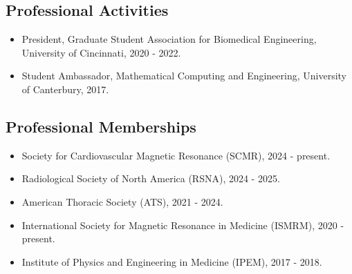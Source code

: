 \documentclass[12pt,]{scrartcl}
\begin{document}





\subsection{Professional Activities}\label{professional-activities}

\begin{itemize}
  \leftskip-0.25in
  \item President, Graduate Student Association for Biomedical Engineering, University of Cincinnati, 2020 - 2022.
  \item Student Ambassador, Mathematical Computing and Engineering, University of Canterbury, 2017.

\end{itemize}

\subsection{Professional Memberships}\label{professional-memberships}

\begin{itemize}
  \leftskip-0.25in
  \item Society for Cardiovascular Magnetic Resonance (SCMR), 2024 - present.
  \item Radiological Society of North America (RSNA), 2024 - 2025.
  \item American Thoracic Society (ATS), 2021 - 2024.
  \item International Society for Magnetic Resonance in Medicine (ISMRM), 2020 - present.
  \item Institute of Physics and Engineering in Medicine (IPEM), 2017 - 2018.
\end{itemize}
\end{document}
